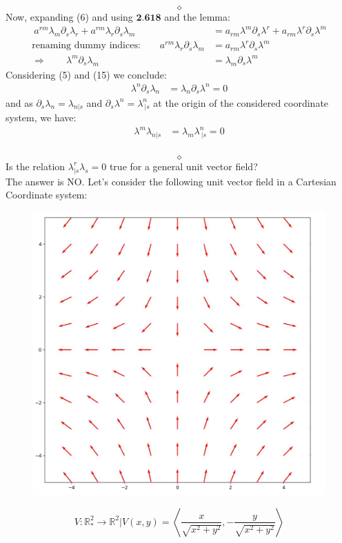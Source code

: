 $$\diamond$$
Now, expanding (6) and using $\textbf{2.618}$ and the lemma:
\begin{align}
\ a^{rm}\lambda_m\partial_s \lambda_r+ a^{rm} \lambda_r \partial_s \lambda_m &= a_{rm} \lambda^m \partial_s \lambda^r + a_{rm} \lambda^r \partial_s \lambda^m\\
\text{renaming dummy indices:}\quad\quad   a^{rm} \lambda_r \partial_s \lambda_m &= a_{rm} \lambda^r \partial_s \lambda^m \\
\Rightarrow\quad\quad \lambda^m \partial_s \lambda_m &= \lambda_m \partial_s \lambda^m
\end{align}
Considering (5) and (15) we conclude:
\begin{align}
\lambda^n \partial_s \lambda_n &= \lambda_n \partial_s \lambda^n = 0
\end{align}
and as $\partial_s \lambda_n = \lambda_{n|s} $ and $\partial_s \lambda^n = \lambda^n_{\ |s} $ at the origin of the considered coordinate system, we have:
\begin{align}
\lambda^m \lambda_{n|s} &= \lambda_m \lambda^n_{\ |s} = 0
\end{align}\\
$$\diamond$$
Is the relation $\lambda^r_{|s}\lambda_s = 0$ true for a general unit vector field?\\
The answer is NO. Let's consider the following unit vector field in a Cartesian Coordinate system:
\begin{figure}[H]
\centering
\begin{minipage}[H]{.4\textwidth}
\vspace{0pt}
\includegraphics[scale=.3]{unitvectorfield1.jpg}
\end{minipage}\hfill
\begin{minipage}[H]{0.4\textwidth}
\vspace{50pt}
$$V:\mathbb{R}_*^2\rightarrow \mathbb{R}^2|V(x,y) = \left< \frac{x}{\sqrt{x^2+y^2}},-\frac{y}{\sqrt{x^2+y^2}} \right>$$
\end{minipage}
\end{figure}
